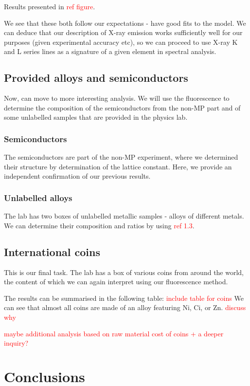 \documentclass[11pt,a4paper,twoside,onecolumn]{article}
\newcommand{\reminder}[1]{\textcolor{red}{#1}}
\begin{document}
Results presented in \reminder{ref figure}.

We see that these both follow our expectations - have good fits to the model. We can deduce that our description of X-ray emission works sufficiently well for our purposes (given experimental accuracy etc), so we can proceed to use X-ray K and L series lines as a signature of a given element in spectral analysis.

\subsection{Provided alloys and semiconductors}
Now, can move to more interesting analysis. We will use the fluorescence to determine the composition of the semiconductors from the non-MP part and of some unlabelled samples that are provided in the physics lab.

\subsubsection{Semiconductors}
The semiconductors are part of the non-MP experiment, where we determined their structure by determination of the lattice constant. Here, we provide an independent confirmation of our previous results. 

\subsubsection{Unlabelled alloys}
The lab has two boxes of unlabelled metallic samples - alloys of different metals. We can determine their composition and ratios by using \reminder{ref 1.3}.

\subsection{International coins}
This is our final task. The lab has a box of various coins from around the world, the content of which we can again interpret using our fluorescence method.

The results can be summarised in the following table:
\reminder{include table for coins}
We can see that almost all coins are made of an alloy featuring Ni, Ci, or Zn. \reminder{discuss why}

\reminder{maybe additional analysis based on raw material cost of coins + a deeper inquiry?}

\section{Conclusions}
\lipsum[1-5]
\end{document}
